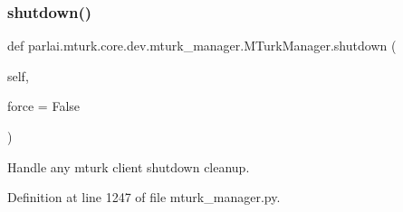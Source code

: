 \subsubsection{\texorpdfstring{shutdown()}{shutdown()}}
{\footnotesize\ttfamily def parlai.\+mturk.\+core.\+dev.\+mturk\+\_\+manager.\+M\+Turk\+Manager.\+shutdown (\begin{DoxyParamCaption}\item[{}]{self,  }\item[{}]{force = {\ttfamily False} }\end{DoxyParamCaption})}

\begin{DoxyVerb}Handle any mturk client shutdown cleanup.
\end{DoxyVerb}
 

Definition at line 1247 of file mturk\+\_\+manager.\+py.


